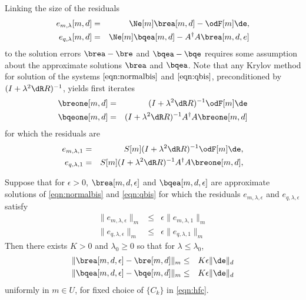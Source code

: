 Linking the size of the residuals
\begin{eqnarray}
\label{eqn:mres}
e_{m,\lambda}[m,d] & = & \Ne[m]\brea[m,d]-\odF[m]\de,\\
\label{eqn:qres}
e_{q,\lambda}[m,d] & = & \Ne[m]\bqea[m,d]-A^{\dagger}A\brea[m,d,e] 
\end{eqnarray}
to the solution errors $\brea-\bre$ and $\bqea-\bqe$ requires some
assumption about the approximate solutions $\brea$ and $\bqea$. Note
that any Krylov method for solution of the systems
$\ref{eqn:normalbis}$ and $\ref{eqn:qbis}$, preconditioned by $(I+\lambda^2\dR
R)^{-1}$, yields first iterates
\begin{eqnarray}
\label{eqn:krylov1}
\breone[m,d]& =& (I+\lambda^2\dR R)^{-1}\odF[m]\de\\
\bqeone[m,d]&=&(I+\lambda^2 \dR R)^{-1}A^{\dagger}A\breone[m,d]
\end{eqnarray}
for which the residuals are
\begin{eqnarray}
\label{eqn:mres1}
e_{m,\lambda,1} & = & S[m](I+\lambda^2\dR R)^{-1}\odF[m]\de,\\
e_{q,\lambda,1} & = & S[m](I+\lambda^2\dR R)^{-1}A^{\dagger}A\breone[m,d],
\end{eqnarray}

\begin{thm} Suppose that for $\epsilon > 0$, $\brea[m,d,\epsilon]$ and
  $\bqea[m,d,\epsilon]$ are approximate solutions of \ref{eqn:normalbis} and
  \ref{eqn:qbis} for which the residuals $e_{m,\lambda,\epsilon}$ and
  $e_{q,\lambda,\epsilon}$ satisfy
\begin{eqnarray}
\label{eqn:mresn}
\|e_{m,\lambda,\epsilon}\|_m & \le & \epsilon \|e_{m,\lambda,1}\|_m\\
\|e_{q,\lambda,\epsilon}\|_m & \le & \epsilon \|e_{q,\lambda,1}\|_m 
\end{eqnarray}
Then there exists $K>0$ and $\lambda_0 \ge 0$ so that for $\lambda \le
\lambda_0$,
\begin{eqnarray}
\label{eqn:postbd1}
\|\brea[m,d,\epsilon] -\bre[m,d]\|_m & \le & K \epsilon\|\de\|_d\\
\label{eqn:postbd2}
\|\bqea[m,d,\epsilon] -\bqe[m,d]\|_m & \le & K \epsilon \|\de\|_d
\end{eqnarray}
uniformly in $m \in U$, for fixed choice of $\{C_k\}$ in
\ref{eqn:hfc}.
\end{thm}

